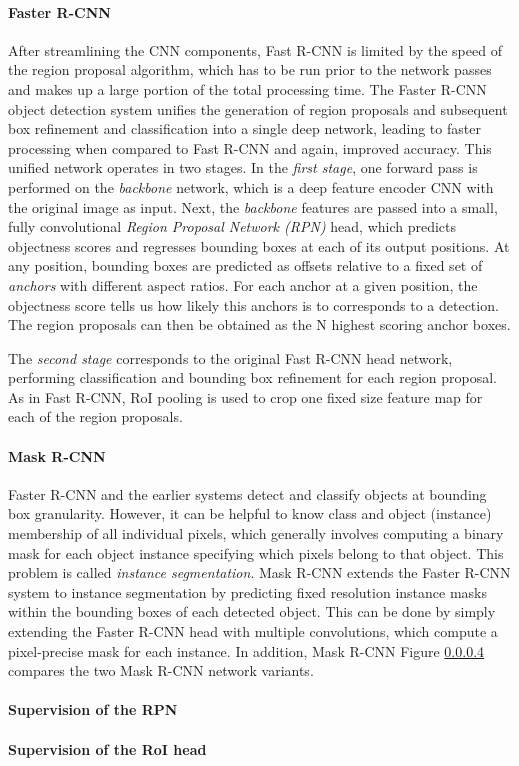 \paragraph{Faster R-CNN}
After streamlining the CNN components, Fast R-CNN is limited by the speed of the region proposal
algorithm, which has to be run prior to the network passes and makes up a large portion of the total
processing time.
The Faster R-CNN object detection system \cite{FasterRCNN} unifies the generation of region proposals and subsequent box refinement and
classification into a single deep network, leading to faster processing when compared to Fast R-CNN
and again, improved accuracy.
This unified network operates in two stages.
In the \emph{first stage}, one forward pass is performed on the \emph{backbone} network,
which is a deep feature encoder CNN with the original image as input.
Next, the \emph{backbone} features are passed into a small, fully convolutional \emph{Region Proposal Network (RPN)} head, which
predicts objectness scores and regresses bounding boxes at each of its output positions.
At any position, bounding boxes are predicted as offsets relative to a fixed set of \emph{anchors} with different
aspect ratios.
For each anchor at a given position, the objectness score tells us how likely this anchors is to corresponds to a detection.
The region proposals can then be obtained as the N highest scoring anchor boxes.

The \emph{second stage} corresponds to the original Fast R-CNN head network, performing classification
and bounding box refinement for each region proposal.
As in Fast R-CNN, RoI pooling is used to crop one fixed size feature map for each of the region proposals.


\paragraph{Mask R-CNN}
Faster R-CNN and the earlier systems detect and classify objects at bounding box granularity.
However, it can be helpful to know class and object (instance) membership of all individual pixels,
which generally involves computing a binary mask for each object instance specifying which pixels belong
to that object. This problem is called \emph{instance segmentation}.
Mask R-CNN \cite{MaskRCNN} extends the Faster R-CNN system to instance segmentation by predicting
fixed resolution instance masks within the bounding boxes of each detected object.
This can be done by simply extending the Faster R-CNN head with multiple convolutions, which
compute a pixel-precise mask for each instance.
In addition, Mask R-CNN
Figure \ref{} compares the two Mask R-CNN network variants.

\paragraph{Supervision of the RPN}
\paragraph{Supervision of the RoI head}
